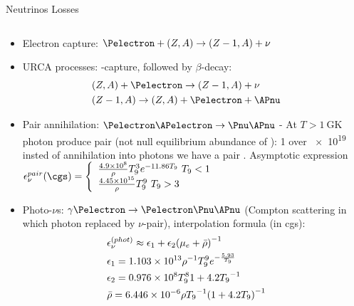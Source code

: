 \begin{frame}{Neutrinos Losses}
    \begin{columns}[T]
        \begin{column}{0.45\textwidth}
    \begin{itemize}
            \item Electron capture: $\Pelectron+(Z,A)\to(Z-1,A)+\nu$
            \item URCA processes: \Pelectron-capture, followed by $\beta$-decay:
                \begin{align*}
                    &(Z,A)+\Pelectron\to(Z-1,A)+\nu\\
                    &(Z-1,A)\to(Z,A)+\Pelectron+\APnu
                \end{align*}
            \item Pair annihilation: $\Pelectron\APelectron\to\Pnu\APnu$ - At $T>\SI{1}{\giga\kelvin}$ photon produce \Pelectron\APelectron pair (not null equilibrium abundance of \APelectron): 1 over \num{e19} insted of annihilation into photons we have a pair \Pnu\APnu. Asymptotic expression $\epsilon_{\nu}^{pair}(\si{\cgs})=\left\{
                        \begin{array}{l}
                                \frac{\num{4.9e8}}{\rho}T_9^3\exp{-11.86T_9}\ T_9<1\\
                                \frac{\num{4.45e15}}{\rho}T_9^9\ T_9>3
                        \end{array}
                    \right.$
                    \item Photo-$\nu$s: $\gamma\Pelectron\to\Pelectron\Pnu\APnu$ (Compton scattering in which photon replaced by $\nu$-pair), interpolation formula (in cgs):
                        \begin{align*}
                        &\epsilon_{\nu}^{(phot)}\approx\epsilon_1+\epsilon_2{(\mu_e+\bar{\rho})}^{-1}\\
                        &\epsilon_1=\num{1.103e13}{\rho}^{-1}T_9^9e^{-\frac{5.93}{T_9}}\\
                        &\epsilon_2=\num{0.976e8}T_9^8{1+4.2T_9}^{-1}\\
                        &\bar{\rho}=\num{6.446e-6}\rho{T_9}^{-1}{(1+4.2T_9)}^{-1}
                        \end{align*}
        \end{itemize}
        \end{column}
        \begin{column}{0.55\textwidth}

\end{column}
\end{columns}
\end{frame}
